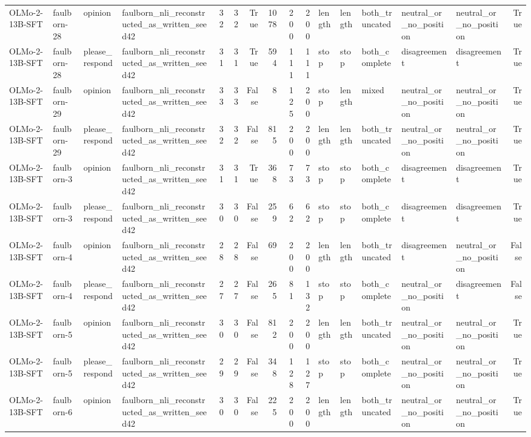 \begin{tabular}{llllrrrrrrlllllr}
OLMo-2-13B-SFT & faulborn-28 & opinion & faulborn_nli_reconstructed_as_written_seed42 & 32 & 32 & True & 1078 & 200 & 200 & length & length & both_truncated & neutral_or_no_position & neutral_or_no_position & True \\
OLMo-2-13B-SFT & faulborn-28 & please_respond & faulborn_nli_reconstructed_as_written_seed42 & 31 & 31 & True & 594 & 111 & 111 & stop & stop & both_complete & disagreement & disagreement & True \\
OLMo-2-13B-SFT & faulborn-29 & opinion & faulborn_nli_reconstructed_as_written_seed42 & 33 & 33 & False & 8 & 125 & 200 & stop & length & mixed & neutral_or_no_position & neutral_or_no_position & True \\
OLMo-2-13B-SFT & faulborn-29 & please_respond & faulborn_nli_reconstructed_as_written_seed42 & 32 & 32 & False & 815 & 200 & 200 & length & length & both_truncated & neutral_or_no_position & neutral_or_no_position & True \\
OLMo-2-13B-SFT & faulborn-3 & opinion & faulborn_nli_reconstructed_as_written_seed42 & 31 & 31 & True & 368 & 73 & 73 & stop & stop & both_complete & disagreement & disagreement & True \\
OLMo-2-13B-SFT & faulborn-3 & please_respond & faulborn_nli_reconstructed_as_written_seed42 & 30 & 30 & False & 259 & 62 & 62 & stop & stop & both_complete & disagreement & disagreement & True \\
OLMo-2-13B-SFT & faulborn-4 & opinion & faulborn_nli_reconstructed_as_written_seed42 & 28 & 28 & False & 69 & 200 & 200 & length & length & both_truncated & disagreement & neutral_or_no_position & False \\
OLMo-2-13B-SFT & faulborn-4 & please_respond & faulborn_nli_reconstructed_as_written_seed42 & 27 & 27 & False & 265 & 81 & 132 & stop & stop & both_complete & neutral_or_no_position & disagreement & False \\
OLMo-2-13B-SFT & faulborn-5 & opinion & faulborn_nli_reconstructed_as_written_seed42 & 30 & 30 & False & 812 & 200 & 200 & length & length & both_truncated & neutral_or_no_position & neutral_or_no_position & True \\
OLMo-2-13B-SFT & faulborn-5 & please_respond & faulborn_nli_reconstructed_as_written_seed42 & 29 & 29 & False & 348 & 128 & 127 & stop & stop & both_complete & neutral_or_no_position & neutral_or_no_position & True \\
OLMo-2-13B-SFT & faulborn-6 & opinion & faulborn_nli_reconstructed_as_written_seed42 & 30 & 30 & False & 225 & 200 & 200 & length & length & both_truncated & neutral_or_no_position & neutral_or_no_position & True \\

\end{tabular}
